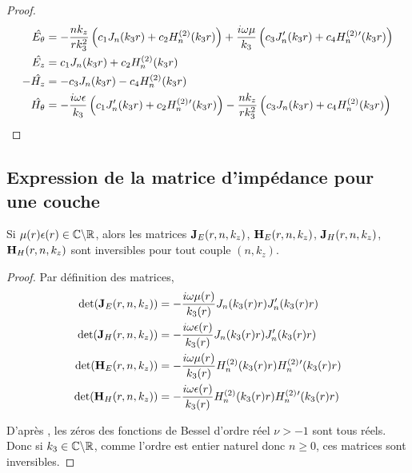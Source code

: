 \begin{proof}
     \begin{align*}
      \hat{E_\theta} &= -\dfrac{nk_z}{rk_3^2}\left(c_1J_n(k_3r) + c_2 H_n^{(2)}(k_3r)\right) + \dfrac{i\omega\mu}{k_3}\left(c_3J_n'(k_3r) + c_4 H_n^{(2)}{}'(k_3r)\right)
      \\
      \hat{E_z} &= c_1 J_n(k_3 r) + c_2 H_n^{(2)}(k_3 r)
      \\
      -\hat{H_z} &= -c_3 J_n(k_3 r) - c_4 H_n^{(2)}(k_3 r)
      \\
      \hat{H_\theta} &= -\dfrac{i\omega\epsilon}{k_3}\left(c_1J_n'(k_3r) + c_2 H_n^{(2)}{}'(k_3r)\right) - \dfrac{nk_z}{rk_3^2}\left(c_3J_n(k_3r) + c_4 H_n^{(2)}(k_3r)\right)
    \end{align*}

  \end{proof}



  \subsection{Expression de la matrice d'impédance pour une couche}

    \begin{lemme}
      \label{lem:cylindre:imp:inv_matrices_JE-HE}
      Si \(\mu(r)\epsilon(r) \in \mathbb C\backslash\mathbb R\), alors les matrices \(\mathbf{J}_E(r,n,k_z)\), \(\mathbf{H}_E(r,n,k_z)\), \(\mathbf{J}_H(r,n,k_z)\), \(\mathbf{H}_H(r,n,k_z)\) sont inversibles pour tout couple \((n,k_z)\).
    \end{lemme}

    \begin{proof}
      Par définition des matrices,
      \begin{align}
        \det(\mathbf{J}_E(r,n,k_z)) &= -\dfrac{i\omega\mu(r)}{k_3(r)}J_n(k_3(r)r)J_n'(k_3(r)r)
        \\
        \det(\mathbf{J}_H(r,n,k_z)) &= -\dfrac{i\omega\epsilon(r)}{k_3(r)}J_n(k_3(r)r)J_n'(k_3(r)r)
        \\
        \det(\mathbf{H}_E(r,n,k_z)) &= -\dfrac{i\omega\mu(r)}{k_3(r)}H_n^{(2)}(k_3(r)r)H_n^{(2)}{}'(k_3(r)r)
        \\
        \det(\mathbf{H}_H(r,n,k_z)) &= -\dfrac{i\omega\epsilon(r)}{k_3(r)}H_n^{(2)}(k_3(r)r)H_n^{(2)}{}'(k_3(r)r)
      \end{align}

      D’après \cite[p.~370]{abramowitz_handbook_1964}, les zéros des fonctions de Bessel d'ordre réel \(\nu >-1\) sont tous réels.
      Donc si \(k_3 \in\mathbb C\backslash\mathbb R\), comme l'ordre est entier naturel donc \(n\ge 0\), ces matrices sont inversibles.
    \end{proof}

